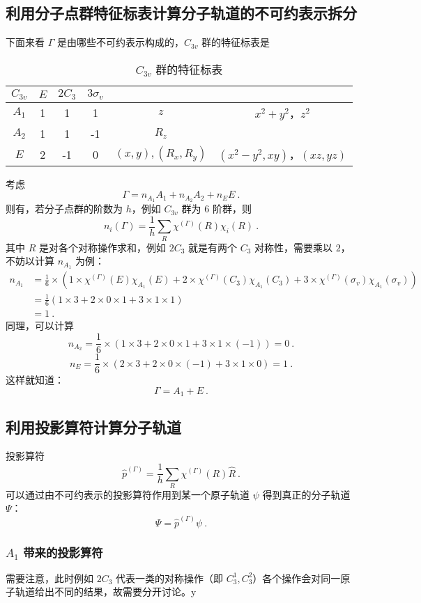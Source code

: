 \subsection{利用分子点群特征标表计算分子轨道的不可约表示拆分}
下面来看 $\Gamma$ 是由哪些不可约表示构成的，$C_{3v}$ 群的特征标表是
\begin{table}[ht]
\centering
\caption{$C_{3v}$ 群的特征标表}\label{tab_SALCs2}
\begin{tabular}{|c|c|c|c|c|c|}
\hline
$C_{3v}$ & $E$ & $2C_3$ & $3\sigma_v$ &  &  \\
\hline
$A_1$ & 1 & 1 & 1 & $z$ & $x^2+y^2$，$z^2$ \\
\hline
$A_2$ & 1 & 1 & -1 & $R_z$ &  \\
\hline
$E$ & 2 & -1 & 0 & $(x, y), (R_x, R_y)$ & $(x^2-y^2, xy)$，$(xz,yz)$ \\
\hline
\end{tabular}
\end{table}
考虑
\begin{equation}
\Gamma = n_{A_1} A_1 + n_{A_2} A_2 + n_{E} E ~.
\end{equation}
则有，若分子点群的阶数为 $h$，例如 $C_{3v}$ 群为 $6$ 阶群，则 
\begin{equation}
n_i(\Gamma) = \frac{1}{h} \sum_R \chi^{(\Gamma)}(R) \chi_i(R) ~.
\end{equation}
其中 $R$ 是对各个对称操作求和，例如 $2C_3$ 就是有两个 $C_3$ 对称性，需要乘以 $2$，不妨以计算 $n_{A_1}$ 为例：
\begin{equation}
\begin{aligned}
n_{A_1} &= \frac{1}{6} \times (1 \times \chi^{(\Gamma)}(E)\chi_{A_1}(E) + 2 \times\chi^{(\Gamma)}(C_3)\chi_{A_1}(C_3)+3\times\chi^{(\Gamma)}(\sigma_v)\chi_{A_1}(\sigma_v)   ) \\
&=\frac{1}{6} (1 \times 3 + 2 \times 0 \times 1 + 3 \times 1 \times 1 )\\
& = 1 ~.
\end{aligned}
\end{equation}
同理，可以计算 
\begin{equation}
n_{A_2} = \frac{1}{6} \times (1 \times 3 + 2 \times 0 \times 1+ 3 \times 1 \times (-1)) = 0 ~.
\end{equation}
\begin{equation}
n_{E} = \frac{1}{6} \times (2 \times 3 + 2 \times 0 \times (-1) + 3 \times 1 \times 0) = 1 ~.
\end{equation}
这样就知道：
$$\Gamma = A_1 + E ~.$$
\subsection{利用投影算符计算分子轨道}
投影算符
$$\hat{p}^{(\Gamma)} = \frac{1}{h} \sum_{R} \chi^{(\Gamma)}(R) \hat R ~.$$
可以通过由不可约表示的投影算符作用到某一个原子轨道 $\psi$ 得到真正的分子轨道 $\Psi$：
$$\Psi = \hat{p}^{(\Gamma)} \psi ~.$$
\subsubsection{$A_1$ 带来的投影算符}
需要注意，此时例如 $2C_3$ 代表一类的对称操作（即 $C_3^1, C_3^2$）各个操作会对同一原子轨道给出不同的结果，故需要分开讨论。y